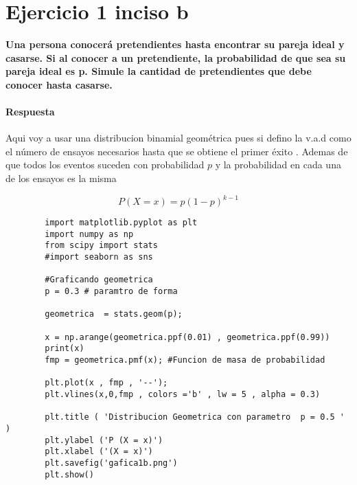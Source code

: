 \documentclass{article}
\begin{document}
    \section*{Ejercicio 1 inciso b }  
    \begin{flushleft}
        
        
        {\bf Una persona conocer\'a pretendientes hasta encontrar su pareja ideal y
        casarse. Si al conocer a un pretendiente, la probabilidad de que sea su pareja ideal
        es p. Simule la cantidad de pretendientes que debe conocer hasta casarse.}
        
        \paragraph{Respuesta} 

        Aqui voy a usar una distribucion binamial geom\'etrica  pues si defino la v.a.d como 
        el n\'umero de ensayos necesarios hasta que se obtiene el primer \'exito . Ademas de 
        que todos los eventos suceden con probabilidad $p$ y la probabilidad en cada una de 
        los ensayos es la misma 

        \begin{equation}
            P \left(X = x \right) = p \left(1-p\right)^{k-1} 
        \end{equation}


        \begin{verbatim} 
        import matplotlib.pyplot as plt 
        import numpy as np 
        from scipy import stats 
        #import seaborn as sns 

        #Graficando geometrica 
        p = 0.3 # paramtro de forma 

        geometrica  = stats.geom(p); 

        x = np.arange(geometrica.ppf(0.01) , geometrica.ppf(0.99))
        print(x) 
        fmp = geometrica.pmf(x); #Funcion de masa de probabilidad 

        plt.plot(x , fmp , '--'); 
        plt.vlines(x,0,fmp , colors ='b' , lw = 5 , alpha = 0.3) 

        plt.title ( 'Distribucion Geometrica con parametro  p = 0.5 '  )
        plt.ylabel ('P (X = x)') 
        plt.xlabel ('(X = x)')
        plt.savefig('gafica1b.png')
        plt.show() 
        \end{verbatim}
        
            
    \end{flushleft}
\end{document}
